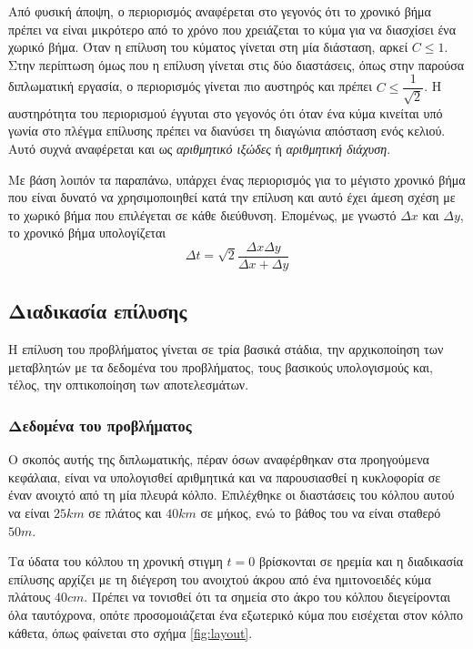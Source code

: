 Από φυσική άποψη, ο περιορισμός  αναφέρεται στο γεγονός ότι το χρονικό βήμα πρέπει να είναι μικρότερο από το χρόνο που χρειάζεται το κύμα για να διασχίσει ένα χωρικό βήμα. Όταν η επίλυση του κύματος γίνεται στη μία διάσταση, αρκεί $ C \le 1$. Στην περίπτωση όμως που η επίλυση γίνεται στις δύο διαστάσεις, όπως στην παρούσα διπλωματική εργασία, ο περιορισμός γίνεται πιο αυστηρός και πρέπει $ C \le \dfrac{1}{\sqrt{2}} $. Η αυστηρότητα του περιορισμού έγγυται στο γεγονός ότι όταν ένα κύμα κινείται υπό γωνία στο πλέγμα επίλυσης πρέπει να διανύσει τη διαγώνια απόσταση ενός κελιού. Αυτό συχνά αναφέρεται και ως \textit{αριθμητικό ιξώδες} ή \textit{αριθμητική διάχυση}.

Με βάση λοιπόν τα παραπάνω, υπάρχει ένας περιορισμός για το μέγιστο χρονικό βήμα που είναι δυνατό να χρησιμοποιηθεί κατά την επίλυση και αυτό έχει άμεση σχέση με το χωρικό βήμα που επιλέγεται σε κάθε διεύθυνση. Επομένως, με γνωστό $Δx$ και $Δy$, το χρονικό βήμα υπολογίζεται
\begin{equation}
    Δt = \sqrt{2}\dfrac{ΔxΔy}{Δx+Δy}
    \label{eq:timestep}
\end{equation}

\subsection{Διαδικασία επίλυσης}
Η επίλυση του προβλήματος γίνεται σε τρία βασικά στάδια, την αρχικοποίηση των μεταβλητών με τα δεδομένα του προβλήματος, τους βασικούς υπολογισμούς και, τέλος, την οπτικοποίηση των αποτελεσμάτων.

\subsubsection{Δεδομένα του προβλήματος}
Ο σκοπός αυτής της διπλωματικής, πέραν όσων αναφέρθηκαν στα προηγούμενα κεφάλαια, είναι να υπολογισθεί αριθμητικά και να παρουσιασθεί η κυκλοφορία σε έναν ανοιχτό από τη μία πλευρά κόλπο. Επιλέχθηκε οι διαστάσεις του κόλπου αυτού να είναι $25km$ σε πλάτος και $40km$ σε μήκος, ενώ το βάθος του να είναι σταθερό $50m$.

Τα ύδατα του κόλπου τη χρονική στιγμη $t=0$ βρίσκονται σε ηρεμία και η διαδικασία επίλυσης αρχίζει με τη διέγερση του ανοιχτού άκρου από ένα ημιτονοειδές κύμα πλάτους $40cm$. Πρέπει να τονισθεί ότι τα σημεία στο άκρο του κόλπου διεγείρονται όλα ταυτόχρονα, οπότε προσομοιάζεται ένα εξωτερικό κύμα που εισέχεται στον κόλπο κάθετα, όπως φαίνεται στο σχήμα \ref{fig:layout}.

